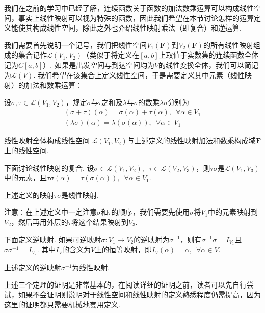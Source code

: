 我们在之前的学习中已经了解，连续函数关于函数的加法数乘运算可以构成线性空间，事实上线性映射可以视为特殊的函数，因此我们希望在本节讨论怎样的运算定义能使其构成线性空间，除此之外也介绍线性映射乘法（即复合）和逆运算.

我们需要首先说明一个记号，我们把线性空间$V_1(\mathbf{F})$到$V_2(\mathbf{F})$的所有线性映射组成的集合记作$\mathcal{L}(V_1,V_2)$（类似于将定义在$[a,b]$上取值于实数集的连续函数全体记为$C[a,b]$）. 如果是出发空间与到达空间均为$V$的线性变换全体，我们可以简记为$\mathcal{L}(V)$. 我们希望在该集合上定义线性空间，于是需要定义其中元素（线性映射）的加法和数乘运算：
\begin{definition}{}{}
    设$\sigma,\tau\in \mathcal{L}(V_1,V_2)$，规定$\sigma$与$\tau$之和及$\lambda$与$\sigma$的数乘$\lambda\sigma$分别为
    \begin{gather*}
        (\sigma+\tau)(\alpha)=\sigma(\alpha)+\tau(\alpha),\enspace\forall\alpha\in V_1 \\
        (\lambda\sigma)(\alpha)=\lambda(\sigma(\alpha)),\enspace\forall\alpha\in V_1
    \end{gather*}
\end{definition}

\begin{theorem}{}{线性映射全体构成线性空间}
    $\mathcal{L}(V_1,V_2)$与上述定义的线性映射加法和数乘构成域$\mathbf{F}$上的线性空间.
\end{theorem}

下面讨论线性映射的复合. 设$\sigma \in \mathcal{L}(V_1,V_2),\enspace\tau \in \mathcal{L}(V_2,V_3)$，则$\tau\sigma$是$\mathcal{L}(V_1,V_3)$中的元素，且$\tau\sigma(\alpha)=\tau(\sigma(\alpha)),\enspace\forall \alpha \in V_1$.
\begin{theorem}{}{}
    上述定义的映射$\tau\sigma$是线性映射.
\end{theorem}
注意：在上述定义中一定注意$\sigma$和$\tau$的顺序，我们需要先使用$\sigma$将$V_1$中的元素映射到$V_2$，然后再用外层的$\tau$将这个结果映射到$V_3$.

下面定义逆映射. 如果可逆映射$\sigma:V_1 \to V_2$的逆映射为$\sigma^{-1}$，则有$\sigma^{-1}\sigma=I_{V_1}$且$\sigma\sigma^{-1}=I_{V_2}$. 其中$I_{V}$的含义为$V$上的恒等映射，即$I_V(\alpha)=\alpha,\enspace \forall \alpha \in V$.
\begin{theorem}{}{}
    上述定义的逆映射$\sigma^{-1}$为线性映射.
\end{theorem}

上述三个定理的证明是非常基本的，在阅读详细的证明之前，读者可以先自行尝试，如果不会证明则说明对于线性空间和线性映射的定义熟悉程度仍需提高，因为这里的证明都只需要机械地套用定义.

